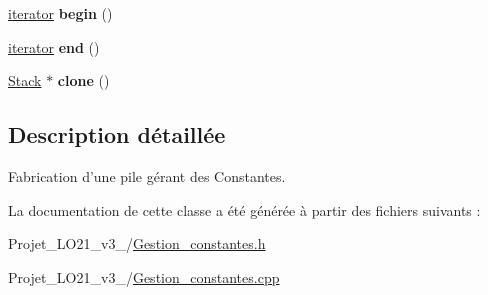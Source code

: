 \begin{DoxyCompactItemize}
\item 
\hypertarget{class_stack_a50571f5f80f8124311b39498a007ac5c}{\hyperlink{class_stack_1_1iterator}{iterator} {\bfseries begin} ()}\label{class_stack_a50571f5f80f8124311b39498a007ac5c}

\item 
\hypertarget{class_stack_a02415f89ea8988765ae889fd9778541c}{\hyperlink{class_stack_1_1iterator}{iterator} {\bfseries end} ()}\label{class_stack_a02415f89ea8988765ae889fd9778541c}

\item 
\hypertarget{class_stack_a2031a4e7e9d813a8b51c6498fe3180ae}{\hyperlink{class_stack}{Stack} $\ast$ {\bfseries clone} ()}\label{class_stack_a2031a4e7e9d813a8b51c6498fe3180ae}

\end{DoxyCompactItemize}


\subsection{Description détaillée}
Fabrication d'une pile gérant des Constantes. 

La documentation de cette classe a été générée à partir des fichiers suivants \-:\begin{DoxyCompactItemize}
\item 
Projet\-\_\-\-L\-O21\-\_\-v3\-\_/\hyperlink{_gestion__constantes_8h}{Gestion\-\_\-constantes.\-h}\item 
Projet\-\_\-\-L\-O21\-\_\-v3\-\_/\hyperlink{_gestion__constantes_8cpp}{Gestion\-\_\-constantes.\-cpp}\end{DoxyCompactItemize}
